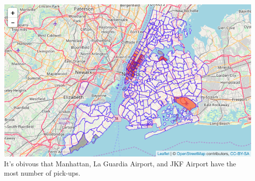 \documentclass[12pt,twoside]{reedthesis}
\theoremstyle{definition}
\theoremstyle{definition}
\theoremstyle{definition}
\theoremstyle{remark}
\begin{document}
\includegraphics{figure/num_trip.png} It's obivous that Manhattan, La
Guardia Airport, and JKF Airport have the most number of pick-ups.
\end{document}
